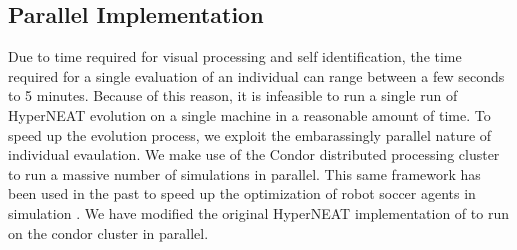 \documentclass{acm_proc_article-sp}
\begin{document}
\label{sec:interface}

\subsection{Parallel Implementation}
\label{sec:condor}
Due to time required for visual processing and self identification, the time required for a single evaluation of an individual can range between a few seconds to 5 minutes. Because of this reason, it is infeasible to run a single run of HyperNEAT evolution on a single machine in a reasonable amount of time. To speed up the evolution process, we exploit the embarassingly parallel nature of individual evaulation. We make use of the Condor distributed processing cluster \cite{condor} to run a massive number of simulations in parallel. This same framework has been used in the past to speed up the optimization of robot soccer agents in simulation \cite{urieli}. We have modified the original HyperNEAT implementation of \cite{original-authors} to run on the condor cluster in parallel.


\end{document}

